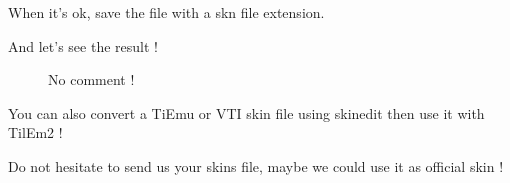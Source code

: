 \documentclass[10pt]{report}
\begin{document}
When it's ok, save the file with a skn file extension.\newline

And let's see the result ! 
\begin{figure}[H]
\centering
{}
\caption{No comment !}
\end{figure}

You can also convert a TiEmu or VTI skin file using skinedit then use it with TilEm2 !\newline

Do not hesitate to send us your skins file, maybe we could use it as official skin !\newline
\end{document}
